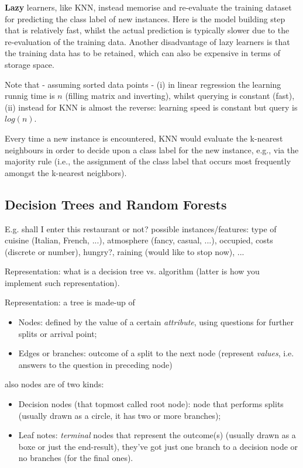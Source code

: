 \documentclass[11pt]{article}
\begin{document}
\textbf{Lazy} learners, like KNN, instead memorise and re-evaluate the training dataset for predicting the class label of new instances. Here is the model building step that is relatively fast, whilst the actual prediction is typically slower due to the re-evaluation of the training data. Another disadvantage of lazy learners is that the training data has to be retained, which can also be expensive in terms of storage space.

Note that - assuming sorted data points - (i) in linear regression the learning runnig time is $n$ (filling matrix and inverting), whilst querying is constant (fast), (ii) instead for KNN is almost the reverse: learning speed is constant but query is $log(n)$. 

Every time a new instance is encountered, KNN would evaluate the k-nearest neighbours in order to decide upon a class label for the new instance, e.g., via the majority rule (i.e., the assignment of the class label that occurs most frequently amongst the k-nearest neighbors).

\subsection{Decision Trees and Random Forests}
E.g. shall I enter this restaurant or not? possible instances/features: type of cuisine (Italian, French, ...), atmosphere (fancy, casual, ...), occupied, costs (discrete or number), hungry?, raining (would like to stop now), ... 

Representation: what is a decision tree vs. algorithm (latter is how you implement such representation).

Representation: a tree is made-up of
\begin{itemize}
	\item Nodes: defined by the value of a certain \textit{attribute}, using questions for further splits or arrival point; 
	\item Edges or branches: outcome of a split to the next node (represent \textit{values}, i.e. answers to the question in preceding node)
\end{itemize}
also nodes are of two kinds:
\begin{itemize}
	\item Decision nodes (that topmost called root node): node that performs splits (usually drawn as a circle, it has two or more branches);
	\item Leaf notes: \textit{terminal} nodes that represent the outcome(s) (usually drawn as a boxe or just the end-result), they've got just one branch to a decision node or no branches (for the final ones).
\end{itemize}
\end{document}
